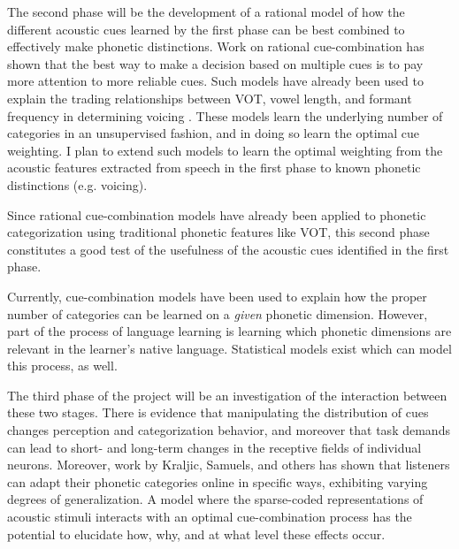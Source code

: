 \documentclass[12pt]{article}
\begin{document}
The second phase will be the development of a rational model of how the different acoustic cues learned by the first phase can be best combined to effectively make phonetic distinctions.  Work on rational cue-combination has shown that the best way to make a decision based on multiple cues is to pay more attention to more reliable cues.  Such models have already been used to explain the trading relationships between VOT, vowel length, and formant frequency in determining voicing \cite{Toscano2008}.  These models learn the underlying number of categories in an unsupervised fashion, and in doing so learn the optimal cue weighting.  I plan to extend such models to learn the optimal weighting from the acoustic features extracted from speech in the first phase to known phonetic distinctions (e.g. voicing).

Since rational cue-combination models have already been applied to phonetic categorization using traditional phonetic features like VOT, this second phase constitutes a good test of the usefulness of the acoustic cues identified in the first phase.  

Currently, cue-combination models have been used to explain how the proper number of categories can be learned on a \emph{given} phonetic dimension.  However, part of the process of language learning is learning which phonetic dimensions are relevant in the learner's native language.  Statistical models exist which can model this process, as well.

The third phase of the project will be an investigation of the interaction between these two stages.  There is evidence that manipulating the distribution of cues changes perception and categorization behavior, and moreover that task demands can lead to short- and long-term changes in the receptive fields of individual neurons.  Moreover, work by Kraljic, Samuels, and others has shown that listeners can adapt their phonetic categories online in specific ways, exhibiting varying degrees of generalization.  A model where the sparse-coded representations of acoustic stimuli interacts with an optimal cue-combination process has the potential to elucidate how, why, and at what level these effects occur.
\end{document}

